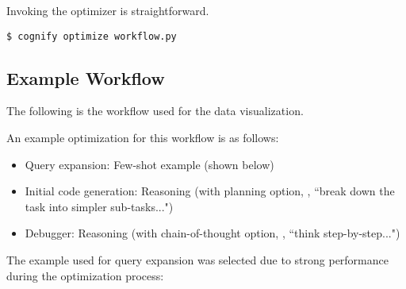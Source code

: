 Invoking the optimizer is straightforward.

\begin{lstlisting}[style=pythonstyle]
$ cognify optimize workflow.py
\end{lstlisting}

\subsection{Example Workflow}
\label{sec:apdx-example}

The following is the workflow used for the data visualization.


An example optimization for this workflow is as follows:
\begin{itemize}
    \item Query expansion: Few-shot example (shown below)
    \item Initial code generation: Reasoning (with planning option, \ie, ``break down the task into simpler sub-tasks...") 
    \item Debugger: Reasoning (with chain-of-thought option, \ie, ``think step-by-step...")
\end{itemize}

The example used for query expansion was selected due to strong performance during the optimization process:\\

